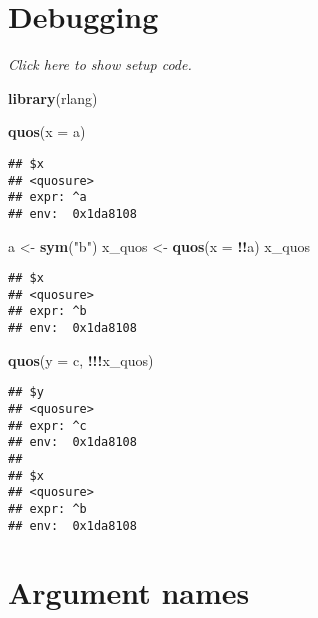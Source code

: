 \documentclass[]{book}
\newenvironment{Shaded}{\begin{snugshade}}{\end{snugshade}}
\newcommand{\DataTypeTok}[1]{\textcolor[rgb]{0.13,0.29,0.53}{#1}}
\newcommand{\KeywordTok}[1]{\textcolor[rgb]{0.13,0.29,0.53}{\textbf{#1}}}
\newcommand{\NormalTok}[1]{#1}
\newcommand{\OperatorTok}[1]{\textcolor[rgb]{0.81,0.36,0.00}{\textbf{#1}}}
\newcommand{\StringTok}[1]{\textcolor[rgb]{0.31,0.60,0.02}{#1}}
\begin{document}
\hypertarget{debugging}{%
\section{Debugging}\label{debugging}}

\emph{Click here to show setup code.}

\begin{Shaded}
\begin{Highlighting}[]
\KeywordTok{library}\NormalTok{(rlang)}
\end{Highlighting}
\end{Shaded}

\begin{Shaded}
\begin{Highlighting}[]
\KeywordTok{quos}\NormalTok{(}\DataTypeTok{x =}\NormalTok{ a)}
\end{Highlighting}
\end{Shaded}

\begin{verbatim}
## $x
## <quosure>
## expr: ^a
## env:  0x1da8108
\end{verbatim}

\begin{Shaded}
\begin{Highlighting}[]
\NormalTok{a <-}\StringTok{ }\KeywordTok{sym}\NormalTok{(}\StringTok{"b"}\NormalTok{)}
\NormalTok{x_quos <-}\StringTok{ }\KeywordTok{quos}\NormalTok{(}\DataTypeTok{x =} \OperatorTok{!!}\NormalTok{a)}
\NormalTok{x_quos}
\end{Highlighting}
\end{Shaded}

\begin{verbatim}
## $x
## <quosure>
## expr: ^b
## env:  0x1da8108
\end{verbatim}

\begin{Shaded}
\begin{Highlighting}[]
\KeywordTok{quos}\NormalTok{(}\DataTypeTok{y =}\NormalTok{ c, }\OperatorTok{!!!}\NormalTok{x_quos)}
\end{Highlighting}
\end{Shaded}

\begin{verbatim}
## $y
## <quosure>
## expr: ^c
## env:  0x1da8108
## 
## $x
## <quosure>
## expr: ^b
## env:  0x1da8108
\end{verbatim}

\hypertarget{argument-names}{%
\section{Argument names}\label{argument-names}}
\end{document}
